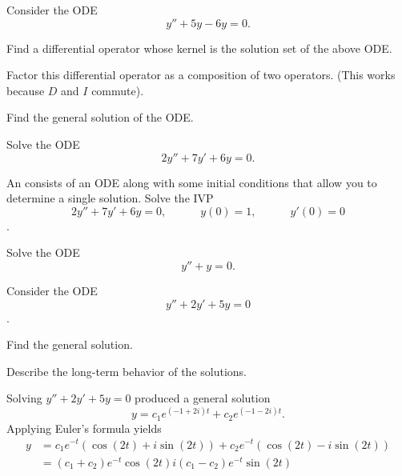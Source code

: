 
\begin{applicationActivities}

\begin{activity}{5}
Consider the ODE \[y''+5y-6y=0.\]
\vfill
\begin{subactivity}
Find a differential operator whose kernel is the solution set of the above ODE.
\end{subactivity}
\begin{subactivity}
Factor this differential operator as a composition of two operators. (This works because \(D\) and \(I\) commute).
\end{subactivity}
\begin{subactivity}
Find the general solution of the ODE.
\end{subactivity}
\end{activity}

\begin{activity}{5}
Solve the ODE \[ 2y''+7y'+6y=0.\]
\end{activity}

\begin{activity}{5}
An  consists of an ODE along with some initial conditions that allow you to determine a single solution.
\vfill
Solve the IVP \[2y''+7y'+6y=0, \hspace{3em} y(0)=1, \hspace{3em} y'(0)=0\].
\end{activity}

\begin{activity}{5}
Solve the ODE \[ y''+y=0.\]
\end{activity}

\begin{activity}{15}
Consider the ODE \[y''+2y'+5y=0\].
\vfill
\begin{subactivity}
Find the general solution.
\end{subactivity}
\begin{subactivity}
Describe the long-term behavior of the solutions.
\end{subactivity}
\end{activity}

\begin{observation}
Solving \(y''+2y'+5y=0\) produced a general solution
\[y=c_1 e^{(-1+2i)t}+c_2 e^{(-1-2i)t}.\]
Applying Euler's formula yields
 \begin{alignat*}{2}
y&=c_1e^{-t} \left(\cos(2t)+i\sin(2t)\right)+c_2 e^{-t} \left(\cos(2t)-i\sin(2t)\right) \\
&=(c_1+c_2)e^{-t} \cos(2t) i(c_1-c_2) e^{-t} \sin(2t)
\end{alignat*}


\end{observation}
\end{applicationActivities}
